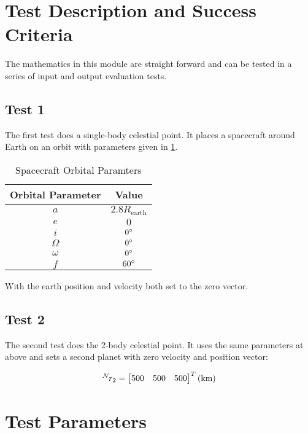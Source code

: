 
\section{Test Description and Success Criteria}
The mathematics in this module are straight forward and can be tested in a series of input and output evaluation tests.

\subsection{Test 1}
The first test does a single-body celestial point. It places a spacecraft around Earth on an orbit with parameters given in \ref{tab:orbitParams}. 
\begin{table}[htbp]
	\caption{Spacecraft Orbital Paramters}
	\label{tab:orbitParams}
	\centering \fontsize{10}{10}\selectfont
	\begin{tabular}{ c | c } %
		\hline\hline
		\textbf{Orbital Parameter}  & \textbf{Value}  \\ 
		\hline
		$a$    		        	     &  $2.8 R_{\text{earth}}	$   \\ 
		$e$           &  $0  $ \\ 
		$i$  & $0 \dg $\\ 
		$\Omega$  & $0\dg  $\\ 
		$\omega$  & $0\dg$\\ 
		$f$  & $60 \dg $\\ 
		\hline\hline
	\end{tabular}
\end{table}

With the earth position and velocity both set to the zero vector.

\subsection{Test 2}
The second test does the 2-body celestial point. It uses the same parameters at above and sets a second planet with zero velocity and position vector:

\begin{equation}
\leftexp{N}{r_2} = \begin{bmatrix}500 & 500 &500 \end{bmatrix}^T (\text{km})
\end{equation}

\section{Test Parameters}

